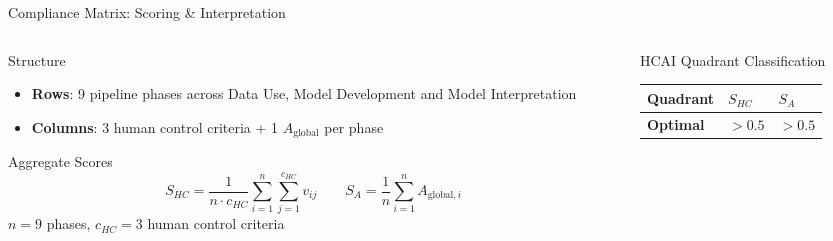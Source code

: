 \documentclass[aspectratio=169,10pt,english,dvipsnames]{beamer}
\begin{document}
\begin{frame}{Compliance Matrix: Scoring \& Interpretation} \small
  \begin{columns}[T]
    \begin{column}{0.52\textwidth}
      \begin{block}{Structure}
        \begin{itemize}\scriptsize
          \item \textbf{Rows}: 9 pipeline phases across Data Use,
                Model Development and Model Interpretation
          \item \textbf{Columns}: 3 human control criteria
                + 1 $A_{\text{global}}$ per phase
        \end{itemize}
      \end{block}
            \vspace{2mm}
      \centering
      \vspace{2mm}
      \begin{exampleblock}{Aggregate Scores}\scriptsize
        \[
          S_{HC} = \frac{1}{n \cdot c_{HC}}\sum_{i=1}^{n}\sum_{j=1}^{c_{HC}} v_{ij}
          \qquad
          S_{A} = \frac{1}{n}\sum_{i=1}^{n} A_{\text{global},i}
        \]
        $n=9$ phases, $c_{HC}=3$ human control criteria
      \end{exampleblock}
    \end{column}
    \begin{column}{0.46\textwidth}
      \begin{block}{HCAI Quadrant Classification}
        \begin{tabular}{p{3.0cm} l l}
          \toprule
          \textbf{Quadrant} & $S_{HC}$ & $S_{A}$ \\
          \midrule
          \cellcolor{green!20}\textbf{Optimal} & $>0.5$ & $>0.5$ \\

\end{tabular}
\end{block}
\end{column}
\end{columns}
\end{frame}
\end{document}
